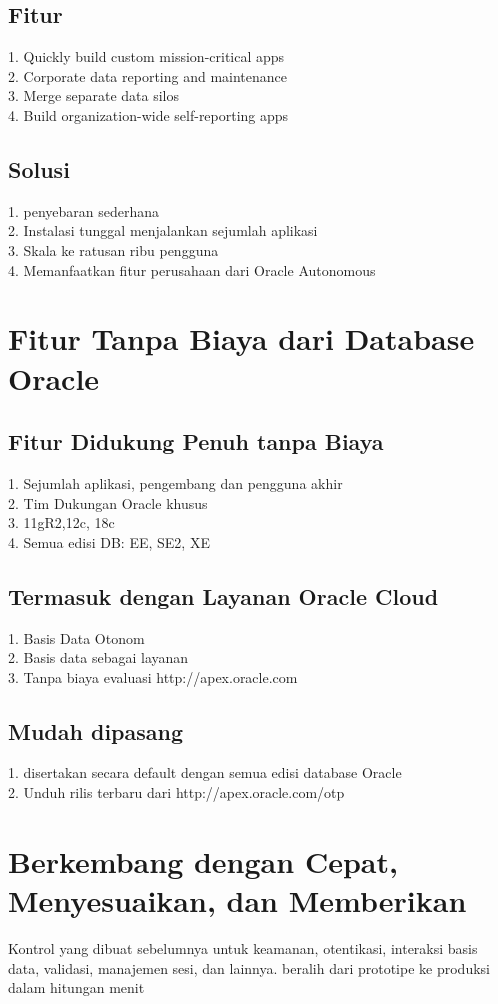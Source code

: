 \documentclass [12pt, times new roman, a4paper]{article}
\begin{document}
\subsection{Fitur}
1. Quickly build custom mission-critical apps\\
2. Corporate data reporting and maintenance\\
3. Merge separate data silos\\
4. Build organization-wide self-reporting apps\\
\subsection{Solusi}
1. penyebaran sederhana\\
2. Instalasi tunggal menjalankan sejumlah aplikasi\\ 
3. Skala ke ratusan ribu pengguna\\
4. Memanfaatkan fitur perusahaan dari Oracle Autonomous\\
\section{Fitur Tanpa Biaya dari Database Oracle}
\subsection{Fitur Didukung Penuh tanpa Biaya}
1. Sejumlah aplikasi, pengembang dan pengguna akhir\\
2. Tim Dukungan Oracle khusus\\
3. 11gR2,12c, 18c\\
4. Semua edisi DB: EE, SE2, XE\\
\subsection{Termasuk dengan Layanan Oracle Cloud}
1. Basis Data Otonom\\
2. Basis data sebagai layanan\\
3. Tanpa biaya evaluasi http://apex.oracle.com\\
\subsection{Mudah dipasang}
1. disertakan secara default dengan semua edisi database Oracle\\
2. Unduh rilis terbaru dari http://apex.oracle.com/otp\\
\section{Berkembang dengan Cepat, Menyesuaikan, dan Memberikan}
Kontrol yang dibuat sebelumnya untuk keamanan, otentikasi, interaksi basis data, validasi, manajemen sesi, dan lainnya. beralih dari prototipe ke produksi dalam hitungan menit
\end{document}
